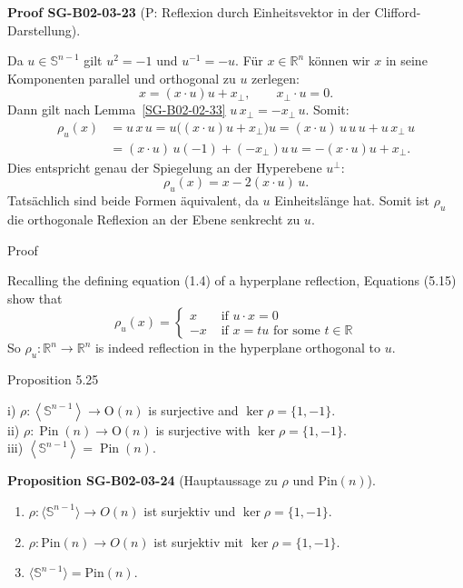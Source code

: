 \documentclass[10pt, letterpaper]{article}
\newcommand{\R}{\mathbb{R}}
\newcommand{\Pin}{\mathrm{Pin}}
\newcommand{\CustomHeading}[3]{%
  \par\medskip\noindent%
  \textbf{#1 #2} \textnormal{(#3)}.\enskip%
}
\newenvironment{PROP}[2]{\begin{unitbox}\CustomHeading{Proposition}{#1}{#2}}{\end{unitbox}}
\newenvironment{PROOF}[2]{\begin{unitbox}\CustomHeading{Proof}{#1}{#2}}{\end{unitbox}}
\begin{document}
\begin{PROOF}{SG-B02-03-23}{P: Reflexion durch Einheitsvektor in der Clifford-Darstellung}
Da \(u\in\mathbb S^{n-1}\) gilt \(u^2=-1\) und \(u^{-1}=-u\).  
Für \(x\in\R^n\) können wir \(x\) in seine Komponenten parallel und orthogonal zu \(u\) zerlegen:
\[
x = (x\cdot u)u + x_\perp, \qquad x_\perp \cdot u = 0.
\]
Dann gilt nach Lemma~\ref{SG-B02-02-33} \(u\,x_\perp = -x_\perp\,u\). Somit:
\begin{align*}
\rho_u(x)
&= u\,x\,u
 = u\big((x\cdot u)u + x_\perp\big)u
 = (x\cdot u)\,u\,u\,u + u\,x_\perp\,u \\
&= (x\cdot u)\,u(-1) + (-x_\perp)u\,u
 = -(x\cdot u)u + x_\perp.
\end{align*}
Dies entspricht genau der Spiegelung an der Hyperebene \(u^\perp\):
\[
\rho_u(x) = x - 2(x\cdot u)\,u.
\]
Tatsächlich sind beide Formen äquivalent, da \(u\) Einheitslänge hat. Somit ist \(\rho_u\) die orthogonale Reflexion an der Ebene senkrecht zu \(u\).
\end{PROOF}



Proof


Recalling the defining equation (1.4) of a hyperplane reflection, Equations (5.15) show that
$$
\rho_{u}(x)=\left\{\begin{aligned}
x & \text { if } u \cdot x=0 \\
-x & \text { if } x=t u \text { for some } t \in \mathbb{R}
\end{aligned}\right.
$$
So $\rho_{u}: \mathbb{R}^{n} \longrightarrow \mathbb{R}^{n}$ is indeed reflection in the hyperplane orthogonal to $u$.




Proposition 5.25


i) $\rho:\left\langle\mathbb{S}^{n-1}\right\rangle \longrightarrow \mathrm{O}(n)$ is surjective and $\operatorname{ker} \rho=\{1,-1\}$.\\
ii) $\rho: \operatorname{Pin}(n) \longrightarrow \mathrm{O}(n)$ is surjective with $\operatorname{ker} \rho=\{1,-1\}$.\\
iii) $\left\langle\mathbb{S}^{n-1}\right\rangle=\operatorname{Pin}(n)$.



\begin{PROP}{SG-B02-03-24}{Hauptaussage zu \(\rho\) und \(\Pin(n)\)}
\begin{enumerate}[label=\textnormal{(\roman*)}]
\item \(\rho:\langle \mathbb S^{n-1}\rangle \to O(n)\) ist surjektiv und \(\ker\rho=\{1,-1\}\).
\item \(\rho:\Pin(n)\to O(n)\) ist surjektiv mit \(\ker\rho=\{1,-1\}\).
\item \(\langle \mathbb S^{n-1}\rangle=\Pin(n)\).
\end{enumerate}
\end{PROP}
\end{document}
